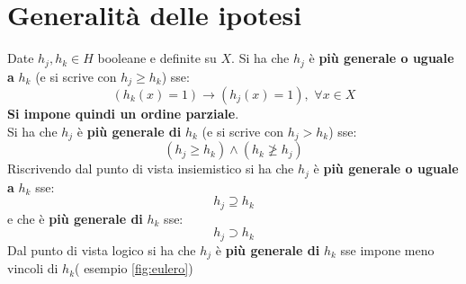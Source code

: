 \section{Generalità delle ipotesi}
\begin{definizione}
  Date $h_j, h_k\in H$ booleane e definite su $X$. Si ha che $h_j$ è \textbf{più
    generale o uguale a} $h_k$ (e si scrive con $h_j\geq h_k$) sse:
  \[(h_k(x)=1)\longrightarrow (h_j(x)=1),\,\,\forall x\in X\]
  \textbf{Si impone quindi un ordine parziale}.\\
  Si ha che $h_j$ è \textbf{più generale di} $h_k$ (e si scrive con $h_j> h_k$)
  sse:
  \[(h_j\geq h_k)\land (h_k\not\geq h_j)\]
  Riscrivendo dal punto di vista insiemistico si ha che $h_j$ è \textbf{più
    generale o uguale a} $h_k$ sse:
  \[h_j\supseteq h_k\]
  e che è \textbf{più generale di} $h_k$ sse:
  \[h_j\supset h_k\]
  Dal punto di vista logico si ha che $h_j$ è \textbf{più generale di} $h_k$ sse
  impone meno vincoli di $h_k$( esempio \ref{fig:eulero})
\end{definizione}
